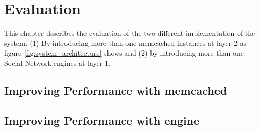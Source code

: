 \chapter{Evaluation}
\label{chapt:evaluation}

This chapter describes the evaluation of the two different implementation of the system. (1) By introducing more than one memcached instances at layer 2 as figure \ref{fig:system_architecture} shows and (2) by introducing more than one Social Network engines at layer 1.

\section{Improving Performance with memcached}
\label{sec:eval_memcache}



\section{Improving Performance with engine}

